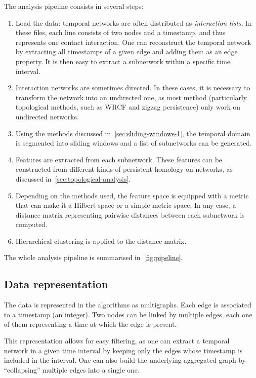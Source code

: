 \documentclass[a4paper,11pt,openany,extrafontsizes]{memoir}
\begin{document}
The analysis pipeline consists in several steps:
\begin{enumerate}
\item Load the data: temporal networks are often distributed as
  \emph{interaction lists}. In these files, each line consists of two
  nodes and a timestamp, and thus represents one contact
  interaction. One can reconstruct the temporal network by extracting
  all timestamps of a given edge and adding them as an edge
  property. It is then easy to extract a subnetwork within a specific
  time interval.
\item Interaction networks are sometimes directed. In these cases, it
  is necessary to transform the network into an undirected one, as
  most method (particularly topological methods, such as WRCF and
  zigzag persistence) only work on undirected networks.
\item Using the methods discussed in~\autoref{sec:sliding-windows-1},
  the temporal domain is segmented into sliding windows and a list of
  subnetworks can be generated.
\item Features are extracted from each subnetwork. These features can
  be constructed from different kinds of persistent homology on
  networks, as discussed in~\autoref{sec:topological-analysis}.
\item Depending on the methods used, the feature space is equipped
  with a metric that can make it a Hilbert space or a simple metric
  space. In any case, a distance matrix representing pairwise
  distances between each subnetwork is computed.
\item Hierarchical clustering is applied to the distance matrix.
\end{enumerate}

The whole analysis pipeline is summarised in~\autoref{fig:pipeline}.

\subsection{Data representation}%
\label{sec:data-representation}

The data is represented in the algorithms as multigraphs. Each edge is
associated to a timestamp (an integer). Two nodes can be linked by
multiple edges, each one of them representing a time at which the edge
is present.

This representation allows for easy filtering, as one can extract a
temporal network in a given time interval by keeping only the edges
whose timestamp is included in the interval. One can also build the
underlying aggregated graph by ``collapsing'' multiple edges into a
single one.
\end{document}
